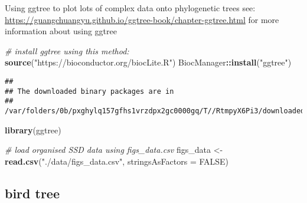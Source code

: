 \documentclass[]{article}
\newenvironment{Shaded}{\begin{snugshade}}{\end{snugshade}}
\newcommand{\KeywordTok}[1]{\textcolor[rgb]{0.13,0.29,0.53}{\textbf{#1}}}
\newcommand{\DataTypeTok}[1]{\textcolor[rgb]{0.13,0.29,0.53}{#1}}
\newcommand{\StringTok}[1]{\textcolor[rgb]{0.31,0.60,0.02}{#1}}
\newcommand{\CommentTok}[1]{\textcolor[rgb]{0.56,0.35,0.01}{\textit{#1}}}
\newcommand{\OtherTok}[1]{\textcolor[rgb]{0.56,0.35,0.01}{#1}}
\newcommand{\OperatorTok}[1]{\textcolor[rgb]{0.81,0.36,0.00}{\textbf{#1}}}
\newcommand{\NormalTok}[1]{#1}
\begin{document}
Using ggtree to plot lots of complex data onto phylogenetic trees see:
\url{https://guangchuangyu.github.io/ggtree-book/chapter-ggtree.html}
for more information about using ggtree

\begin{Shaded}
\begin{Highlighting}[]
\CommentTok{# install ggtree using this method:}
  \KeywordTok{source}\NormalTok{(}\StringTok{"https://bioconductor.org/biocLite.R"}\NormalTok{)}
\NormalTok{  BiocManager}\OperatorTok{::}\KeywordTok{install}\NormalTok{(}\StringTok{"ggtree"}\NormalTok{)}
\end{Highlighting}
\end{Shaded}

\begin{verbatim}
## 
## The downloaded binary packages are in
##  /var/folders/0b/pxghylq157gfhs1vrzdpx2gc0000gq/T//RtmpyX6Pi3/downloaded_packages
\end{verbatim}

\begin{Shaded}
\begin{Highlighting}[]
  \KeywordTok{library}\NormalTok{(ggtree)}

\CommentTok{# load organised SSD data using figs_data.csv }
\NormalTok{  figs_data <-}\StringTok{ }\KeywordTok{read.csv}\NormalTok{(}\StringTok{"./data/figs_data.csv"}\NormalTok{, }\DataTypeTok{stringsAsFactors =} \OtherTok{FALSE}\NormalTok{)}
\end{Highlighting}
\end{Shaded}

\subsection{bird tree}\label{bird-tree}
\end{document}
